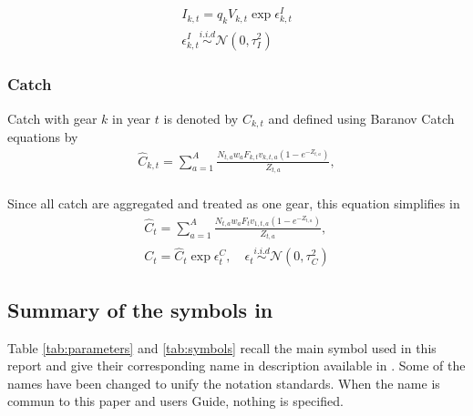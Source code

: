  
\begin{gather}
I_{k,t} = q_k V_{k,t} \exp{\epsilon_{k,t}^I}\\
\epsilon_{k,t}^I \overset{i.i.d}{\sim} \mathcal{N}(0,\tau_I^2)\nonumber
\end{gather}
\subsubsection{Catch}
Catch  with  gear  $k$  in  year  $t$  is  denoted  by  $C_{k,t}$  and
defined using Baranov Catch equations by
\begin{gather*}
\hat{C}_{k,t}   =   \sum_{a=1}^A   \frac{N_{t,a}   w_a   F_{k,t}   v_{k,t,a}
  (1-e^{-Z_{t,a}}) }{Z_{t,a}},\\
\end{gather*}

Since all catch are aggregated and treated as one gear, this equation simplifies in 
\begin{gather}
\hat{C}_{t}   =   \sum_{a=1}^A   \frac{N_{t,a}   w_a   F_{t}   v_{1,t,a}
  (1-e^{-Z_{t,a}}) }{Z_{t,a}},\\
C_{t} = \hat{C}_{t} \exp{\epsilon_{t}^C}, \quad \epsilon_{t}\overset{i.i.d}{\sim}\mathcal{N}(0, \tau^2_C)\nonumber
\end{gather}

\subsection{Summary of the symbols in \iscam}

Table  \ref{tab:parameters}  and  \ref{tab:symbols}  recall  the  main
symbol used in this report and give their corresponding name in \iscam
description available  in \cite{Martell11}. Some of  the names have
been changed to unify the notation  standards. When the name is commun
to this paper and \iscam users Guide, nothing is specified.


